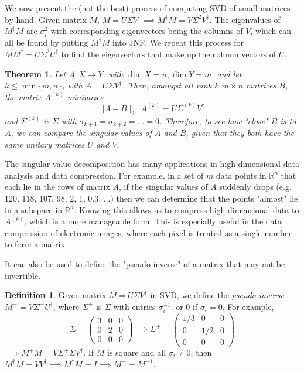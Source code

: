 \documentclass{article}
\newtheorem{theorem}{Theorem}[section]
\theoremstyle{remark}
\theoremstyle{definition}
\newtheorem{definition}{Definition}[section]
\begin{document}
We now present the (not the best) process of computing SVD of small matrices by hand. Given matrix $M$, $M = U \Sigma V^\dagger \implies M^\dagger M = V \Sigma^2 V^\dagger$. The eigenvalues of $M^\dagger M$ are $\sigma_i^2$ with corresponding eigenvectors being the columns of $V$, which can all be found by putting $M^\dagger M$ into JNF. We repeat this process for $M M^\dagger = U \Sigma^2 U^\dagger$ to find the eigenvectors that make up the column vectors of $U$. 

\begin{theorem}
Let $A: X \longrightarrow Y$, with $\dim{X} = n, \dim{Y} = m$, and let $k \leq \min{\{m, n\}}$, with $A = U \Sigma V^\dagger$. Then, amongst all rank $k$ $m \times n$ matrices $B$, the matrix $A^{(k)}$ minimizes 
\[||A-B||_2, \; A^{(k)} = U \Sigma^{(k)} V^\dagger\]
and $\Sigma^{(k)}$ is $\Sigma$ with $\sigma_{k+1} = \sigma_{k+2} = ... = 0$. Therefore, to see how "close" $B$ is to $A$, we can compare the singular values of $A$ and $B$, given that they both have the same unitary matrices $U$ and $V$. 
\end{theorem}

The singular value decomposition has many applications in high dimensional data analysis and data compression. For example, in a set of $m$ data points in $\mathbb{R}^n$ that each lie in the rows of matrix $A$, if the singular values of $A$ suddenly drops (e.g. 120, 118, 107, 98, 2, 1, 0.3, ...) then we can determine that the points "almost" lie in a subspace in $\mathbb{R}^n$. Knowing this allows us to compress high dimensional data to $A^{(k)}$, which is a more manageable form. This is especially useful in the data compression of electronic images, where each pixel is treated as a single number to form a matrix. 

It can also be used to define the "pseudo-inverse" of a matrix that may not be invertible. 

\begin{definition}
Given matrix $M = U \Sigma V^\dagger$ in SVD, we define the \textit{pseudo-inverse} $M^+ = V \Sigma^+ U^\dagger$, where $\Sigma^+$ is $\Sigma$ with entries $\sigma_i^{-1}$, or $0$ if $\sigma_i = 0$. For example,
\[ \Sigma = \begin{pmatrix}3&0&0\\0&2&0\\0&0&0\end{pmatrix} \implies \Sigma^+ = \begin{pmatrix}1/3&0&0\\0&1/2&0\\0&0&0\end{pmatrix}\]
$\implies M^+ M = V \Sigma^+ \Sigma V^\dagger$. If $M$ is square and all $\sigma_i \neq 0$, then $M^\dagger M = V V^\dagger \implies M^\dagger M = I \implies  M^+ = M^{-1}$. 
\end{definition}
\end{document}
